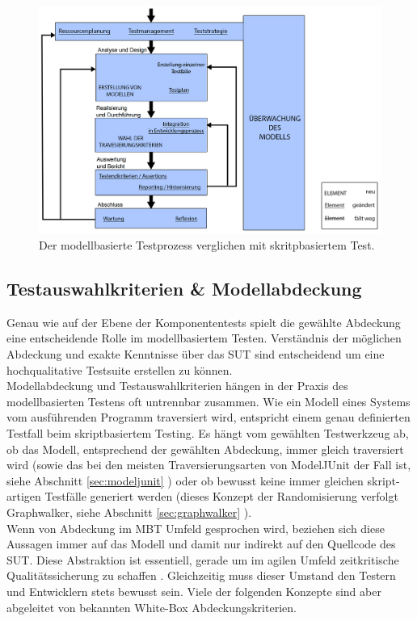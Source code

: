 \begin{figure}[h] 
  \centering
     \includegraphics[width=1.1\textwidth]{figures/mbt_vergleich_skript.png}
  \caption{Der modellbasierte Testprozess verglichen mit skritpbasiertem Test.}
  \label{fig:script_vs_mbt}
\end{figure}

\subsection{Testauswahlkriterien \& Modellabdeckung}
\label{sec:coverage}

Genau wie auf der Ebene der Komponententests spielt die gewählte Abdeckung eine entscheidende Rolle im modellbasiertem Testen. Verständnis der möglichen Abdeckung und exakte Kenntnisse über das \Gls{SUT} sind entscheidend um eine hochqualitative Testsuite erstellen zu können.\\
Modellabdeckung und Testauswahlkriterien hängen in der Praxis des modellbasierten Testens oft untrennbar zusammen. Wie ein Modell eines Systems vom ausführenden Programm traversiert wird, entspricht einem genau definierten Testfall beim skriptbasiertem Testing. Es hängt vom gewählten Testwerkzeug ab, ob das Modell, entsprechend der gewählten Abdeckung, immer gleich traversiert wird (sowie das bei den meisten Traversierungsarten von ModelJUnit der Fall ist, siehe Abschnitt \ref{sec:modeljunit} ) oder ob bewusst keine immer gleichen skript-artigen Testfälle generiert werden (dieses Konzept der Randomisierung verfolgt Graphwalker, siehe Abschnitt \ref{sec:graphwalker} ).\\
Wenn von Abdeckung im \Gls{MBT} Umfeld gesprochen wird, beziehen sich diese Aussagen immer auf das Modell und damit nur indirekt auf den Quellcode des \Gls{SUT}. Diese Abstraktion ist essentiell, gerade um im agilen Umfeld zeitkritische Qualitätssicherung zu schaffen \cite{utting_practical_2007}. Gleichzeitig muss dieser Umstand den Testern und Entwicklern stets bewusst sein. Viele der folgenden Konzepte sind aber abgeleitet von bekannten White-Box Abdeckungskriterien.

